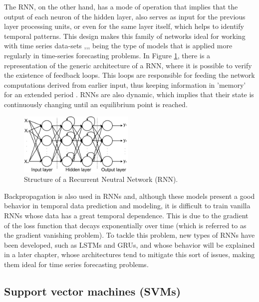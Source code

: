 The \ac{RNN}, on the other hand, has a mode of operation that implies that the output of each neuron of the hidden layer, also serves as input for the previous layer processing units, or even for the same layer itself, which helps to identify temporal patterns. This design makes this family of networks ideal for working with time series data-sets \cite{rnn1},\cite{rnn2},\cite{rnn3}, being the type of models that is applied more regularly in time-series forecasting problems. In Figure \ref{rnn}, there is a representation of the generic architecture of a \ac{RNN}, where it is possible to verify the existence of feedback loops. This loops are responsible for feeding the network computations derived from earlier input, thus keeping information in 'memory' for an extended period \cite{rnn4}. \ac{RNN}s are also dynamic, which implies that their state is continuously changing until an equilibrium point is reached. 

\begin{figure}[h!]
    \centering
    \begin{center}
    \includegraphics[width=0.49\textwidth]{Images/rnn.png}
    \caption{Structure of a Recurrent Neutral Network (RNN).}
    \label{rnn}
    \end{center}
\end{figure}



Backpropagation is also used in \ac{RNN}s and, although these models present a good behavior in temporal data prediction and modeling, it is difficult to train vanilla \ac{RNN}s whose data has a great temporal dependence. This is due to the gradient of the loss function that decays exponentially over time (which is referred to as the gradient vanishing problem)\cite{rnn4}. To tackle this problem, new types of \ac{RNN}s have been developed, such as \ac{LSTM}s and \ac{GRU}s, and whose behavior will be explained in a later chapter, whose architectures tend to mitigate this sort of issues, making them ideal for time series forecasting problems.

\subsection{Support vector machines (SVMs)}

